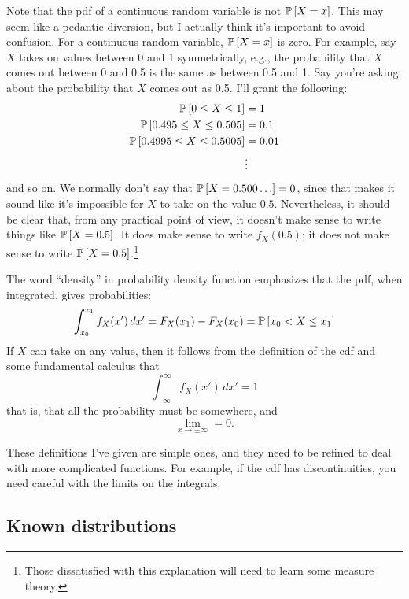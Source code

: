 Note that the pdf of a continuous random variable is not $\mathbb{P}\left[{X = x}\right]$. This
may seem like a pedantic diversion, but I actually think it's important to
avoid confusion. For a continuous random variable, $\mathbb{P}\left[{X = x}\right]$ is zero. For
example, say $X$ takes on values between 0 and 1 symmetrically, e.g., the
probability that $X$ comes out between 0 and 0.5 is the same as between 0.5
and 1. Say you're asking about the probability that $X$ comes out as 0.5. I'll
grant the following:
\begin{align*}
\mathbb{P}\left[{0 \leq X \leq 1}\right] &= 1 \\
\mathbb{P}\left[{0.495 \leq X \leq 0.505}\right] &= 0.1 \\
\mathbb{P}\left[{0.4995 \leq X \leq 0.5005}\right] &= 0.01 \\
&\vdots
\end{align*}
and so on. We normally don't say that $\mathbb{P}\left[{X = 0.500\ldots}\right] = 0$, since that
makes it sound like it's impossible for $X$ to take on the value $0.5$.
Nevertheless, it should be clear that, from any practical point of view, it
doesn't make sense to write things like $\mathbb{P}\left[{X = 0.5}\right]$. It does make sense
to write $f_X(0.5)$; it does not make sense to write $\mathbb{P}\left[{X =
0.5}\right]$.\footnote{Those dissatisfied with this explanation will need to learn
some measure theory.}

The word ``density'' in probability density function emphasizes that the pdf,
when integrated, gives probabilities:
\begin{equation}\label{eq:integrated_pdf}
\int_{x_0}^{x_1} f_X(x') \,dx' = F_X(x_1) - F_X(x_0) = \mathbb{P}\left[{x_0 < X \leq x_1}\right]
\end{equation}
If $X$ can take on any value, then it follows from the definition of the cdf and
some fundamental calculus that
\begin{equation}
\int_{-\infty}^\infty f_X(x') \,dx' = 1
\end{equation}
that is, that all the probability must be somewhere, and
\begin{equation}
\lim_{x \to \pm \infty} = 0.
\end{equation}

These definitions I've given are simple ones, and they need to be refined to
deal with more complicated functions. For example, if the cdf has
discontinuities, you need careful with the limits on the integrals.

\subsection{Known distributions}

